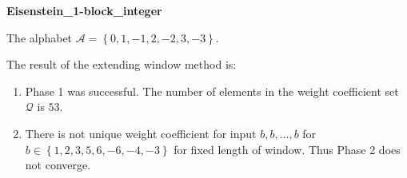 \begin{exmp}
\textbf{ Eisenstein\_1-block\_integer }

\label{ex:Eisenstein1-blockinteger}

The alphabet $\mathcal{A} =\left\{0, 1, -1, 2, -2, 3, -3\right\}$.

The result of the extending window method is:
\begin{enumerate}
    \item Phase 1 was successful.
The number of elements in the weight coefficient set $\mathcal{Q}$ is $53$.

    \item There is not unique weight coefficient for input $b,b,\dots,b$ for $b\in\left\{1, 2, 3, 5, 6, -6, -4, -3\right\}$ for fixed length of window. Thus Phase 2 does not converge.

\end{enumerate}
\end{exmp}
